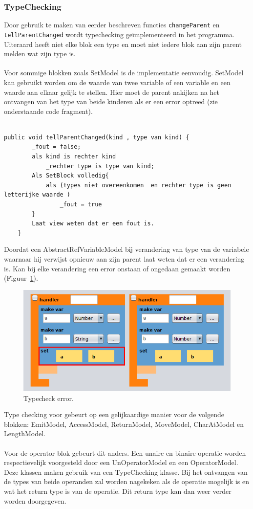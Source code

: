 \documentclass[]{article}
\begin{document}
\subsubsection{TypeChecking}
\label{TypeChecking}
Door gebruik te maken van eerder beschreven functies \texttt{changeParent} en \\ \texttt{tellParentChanged} wordt typechecking ge\"{i}mplementeerd in het programma. Uiteraard heeft niet elke blok een type en moet niet iedere blok aan zijn parent melden wat zijn type is.\\\\
Voor sommige blokken zoals SetModel is de implementatie eenvoudig. SetModel kan gebruikt worden om de waarde van twee variable of een variable en een waarde aan elkaar gelijk te stellen. Hier moet de parent nakijken na het ontvangen van het type van beide kinderen als er een error optreed (zie onderstaande code fragment).\\\\
\lstset{language=Java}
\begin{lstlisting}
public void tellParentChanged(kind , type van kind) {
		_fout = false;
		als kind is rechter kind
			_rechter type is type van kind;
		Als SetBlock volledig{
			als (types niet overeenkomen  en rechter type is geen letterijke waarde )
				_fout = true
		}
		Laat view weten dat er een fout is.
	}
\end{lstlisting}
Doordat een AbstractRefVariableModel bij verandering van type van de variabele waarnaar hij verwijst opnieuw aan zijn parent laat weten dat er een verandering is. Kan bij elke verandering een error onstaan of ongedaan gemaakt worden (Figuur~\ref{typeCheckerror}).
\begin{figure}[H]
  \centering
\includegraphics[scale=0.4]{AnalyseADTAlgorithm/blockmodel/typecheckError}
  \caption{Typecheck error.} \label{typeCheckerror}
\end{figure}
Type checking voor gebeurt op een gelijkaardige manier voor de volgende blokken: EmitModel, AccessModel, ReturnModel, MoveModel, CharAtModel en LengthModel.\\\\
Voor de operator blok gebeurt dit anders. Een unaire en binaire operatie worden respectievelijk voorgesteld door een UnOperatorModel en een OperatorModel.
Deze klassen maken gebruik van een TypeChecking klasse. Bij het ontvangen van de types van beide operanden zal worden nagekeken als de operatie mogelijk is en wat het return type is van de operatie. Dit return type kan dan weer verder worden doorgegeven. 
\end{document}
